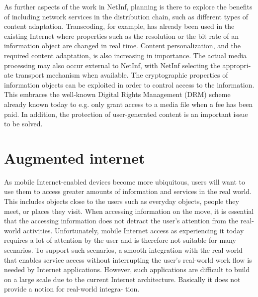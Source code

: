 As further aspects of the work in NetInf, planning is there to explore the benefits of including
network services in the distribution chain, such as different types of content adaptation.
Transcoding, for example, has already been used in the existing Internet where properties
such as the resolution or the bit rate of an information object are changed in real time. Content
personalization, and the required content adaptation, is also increasing in importance. The
actual media processing may also occur external to NetInf, with NetInf selecting the appropri-
ate transport mechanism when available. The cryptographic properties of information objects
can be exploited in order to control access to the information. This embraces the well-known
Digital Rights Management (DRM) scheme already known today to e.g. only grant access to a
media file when a fee has been paid. In addition, the protection of user-generated content is
an important issue to be solved.

\section{Augmented internet}
As mobile Internet-enabled devices become more ubiquitous, users will want to use them to
access greater amounts of information and services in the real world. This includes objects
close to the users such as everyday objects, people they meet, or places they visit. When
accessing information on the move, it is essential that the accessing information does not
detract the user's attention from the real-world activities. Unfortunately, mobile Internet access
as experiencing it today requires a lot of attention by the user and is therefore not suitable
for many scenarios. To support such scenarios, a smooth integration with the real world that
enables service access without interrupting the user's real-world work flow is needed by
Internet applications. However, such applications are difficult to build on a large scale due to
the current Internet architecture. Basically it does not provide a notion for real-world integra-
tion.

